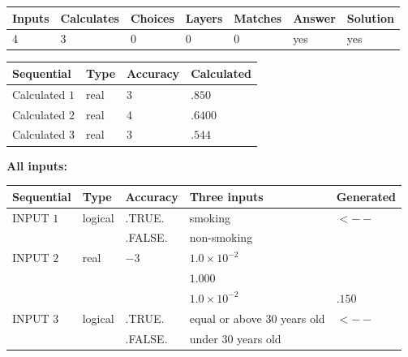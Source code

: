 \documentclass[12pt]{article}
\begin{document}
   
   
   
\noindent\begin{tabular}{|l|l|l|l|l|l|l|}
 \hline
Inputs & Calculates & Choices & Layers & Matches & Answer & Solution \\ \hline
           4 & 
           3 & 
           0
  & 
           0 & 
           0 & 
  yes & 
  yes 
  \\ \hline
 \end{tabular}
   
   
   
   
\noindent{}
   
   
  
  
\noindent\begin{tabular}{|l|l|l|l|}
\hline
 Sequential & Type & Accuracy & Calculated \\ 
\hline
 
 
  Calculated $           1$ & real & $           3 $ & 
 $ .850 $ 
 \\  \hline  
 
 
  Calculated $           2$ & real & $           4 $ & 
 $ .6400 $ 
 \\  \hline  
 
 
  Calculated $           3$ & real & $           3 $ & 
 $ .544 $ 
 \\  \hline  
 \end{tabular}
   
   
   
   
\noindent\vspace{0.1in}\hspace{-0.08in} {\textbf{\Large{All inputs: }}}
   
   
  
  
\noindent\begin{tabular}{|l|l|l|l|l|}
\hline
 Sequential & Type & Accuracy & Three inputs & Generated \\ 
\hline
 
 
  INPUT $           1$ & logical & .TRUE. & 
 smoking & 
  $ <-- $ 
  \\
  & & .FALSE. & 
  non-smoking & 
 \\  \hline  
 
 
  INPUT $           2$ & real & $          -3 $ & $
 1.0 \times 10^{-2}
  $ & \\
  & & &  $
 1.000
  $ & \\
  & & &  $
 1.0 \times 10^{-2}
 $ & $ .150 $ 
 \\  \hline  
 
 
  INPUT $           3$ & logical & .TRUE. & 
 equal or above 30 years old & 
  $ <-- $ 
  \\
  & & .FALSE. & 
  under 30 years old & 
 \\  \hline  
 \end{tabular}
   
\end{document}
